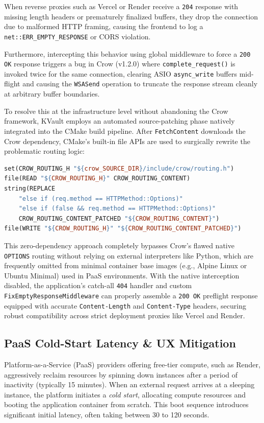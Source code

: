 \documentclass[11pt,a4paper]{article}
\begin{document}
When reverse proxies such as Vercel or Render receive a \texttt{204} response with missing length headers or prematurely finalized buffers, they drop the connection due to malformed HTTP framing, causing the frontend to log a \texttt{net::ERR\_EMPTY\_RESPONSE} or CORS violation. 

Furthermore, intercepting this behavior using global middleware to force a \texttt{200 OK} response triggers a bug in Crow (v1.2.0) where \texttt{complete\_request()} is invoked twice for the same connection, clearing ASIO \texttt{async\_write} buffers mid-flight and causing the \texttt{WSASend} operation to truncate the response stream cleanly at arbitrary buffer boundaries.

To resolve this at the infrastructure level without abandoning the Crow framework, KVault employs an automated source-patching phase natively integrated into the CMake build pipeline. After \texttt{FetchContent} downloads the Crow dependency, CMake's built-in file APIs are used to surgically rewrite the problematic routing logic:

\begin{lstlisting}[language=make]
set(CROW_ROUTING_H "${crow_SOURCE_DIR}/include/crow/routing.h")
file(READ "${CROW_ROUTING_H}" CROW_ROUTING_CONTENT)
string(REPLACE 
    "else if (req.method == HTTPMethod::Options)" 
    "else if (false && req.method == HTTPMethod::Options)" 
    CROW_ROUTING_CONTENT_PATCHED "${CROW_ROUTING_CONTENT}")
file(WRITE "${CROW_ROUTING_H}" "${CROW_ROUTING_CONTENT_PATCHED}")
\end{lstlisting}

This zero-dependency approach completely bypasses Crow's flawed native \texttt{OPTIONS} routing without relying on external interpreters like Python, which are frequently omitted from minimal container base images (e.g., Alpine Linux or Ubuntu Minimal) used in PaaS environments. With the native interception disabled, the application's catch-all \texttt{404} handler and custom \texttt{FixEmptyResponseMiddleware} can properly assemble a \texttt{200 OK} preflight response equipped with accurate \texttt{Content-Length} and \texttt{Content-Type} headers, securing robust compatibility across strict deployment proxies like Vercel and Render.

\subsection{PaaS Cold-Start Latency \& UX Mitigation}
Platform-as-a-Service (PaaS) providers offering free-tier compute, such as Render, aggressively reclaim resources by spinning down instances after a period of inactivity (typically 15 minutes). When an external request arrives at a sleeping instance, the platform initiates a \textit{cold start}, allocating compute resources and booting the application container from scratch. This boot sequence introduces significant initial latency, often taking between 30 to 120 seconds. 
\end{document}
